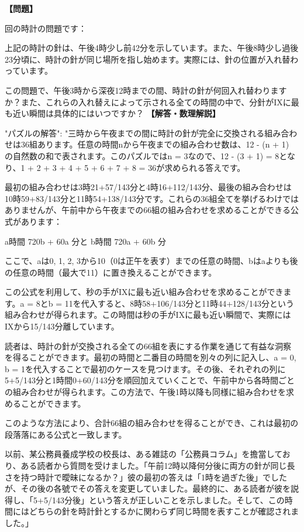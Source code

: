 \documentclass[10pt,a4paper,oneside,openany]{ltjsbook}
\begin{document}
\begin{tcolorbox}[colback=softblue,colframe=primaryblue,title=\textbf{第 61 問：CHANGING PLACES.},arc=2mm,boxrule=1pt,breakable]
\textbf{【問題】}\par\vspace{0.3em}
回の時計の問題です：

上記の時計の針は、午後4時少し前42分を示しています。また、午後8時少し過後23分頃に、時計の針が同じ場所を指し始めます。実際には、針の位置が入れ替わっています。

この問題で、午後3時から深夜12時までの間、時計の針が何回入れ替わりますか？また、これらの入れ替えによって示される全ての時間の中で、分針がIXに最も近い瞬間は具体的にはいつですか？
\tcblower
\textbf{【解答・数理解説】}\par\vspace{0.3em}
{
    "パズルの解答": "三時から午夜までの間に時計の針が完全に交換される組み合わせは36組あります。任意の時間nから午夜までの組み合わせ数は、12 - (n + 1) の自然数の和で表されます。このパズルではn = 3なので、12 - (3 + 1) = 8となり、1 + 2 + 3 + 4 + 5 + 6 + 7 + 8 = 36が求められる答えです。

最初の組み合わせは3時21+57/143分と4時16+112/143分、最後の組み合わせは10時59+83/143分と11時54+138/143分です。これらの36組全てを挙げるわけではありませんが、午前中から午夜までの66組の組み合わせを求めることができる公式があります：

a時間 720b + 60a 分と b時間 720a + 60b 分

ここで、aは0, 1, 2, 3から10（0は正午を表す）までの任意の時間、bはaよりも後の任意の時間（最大で11）に置き換えることができます。

この公式を利用して、秒の手がIXに最も近い組み合わせを求めることができます。a = 8とb = 11を代入すると、8時58+106/143分と11時44+128/143分という組み合わせが得られます。この時間は秒の手がIXに最も近い瞬間で、実際にはIXから15/143分離しています。

読者は、時計の針が交換される全ての66組を表にする作業を通じて有益な洞察を得ることができます。最初の時間と二番目の時間を別々の列に記入し、a = 0, b = 1を代入することで最初のケースを見つけます。その後、それぞれの列に5+5/143分と1時間0+60/143分を順回加えていくことで、午前中から各時間ごとの組み合わせが得られます。この方法で、午後1時以降も同様に組み合わせを求めることができます。

このような方法により、合計66組の組み合わせを得ることができ、これは最初の段落落にある公式と一致します。

以前、某公務員養成学校の校長は、ある雑誌の「公務員コラム」を擔當しており、ある読者から質問を受けました。「午前12時以降何分後に両方の針が同じ長さを持つ時計で曖昧になるか？」彼の最初の答えは「1時を過ぎた後」でしたが、その後の各號でその答えを変更していました。最終的に、ある読者が彼を説得し、「5+5/143分後」という答えが正しいことを示しました。そして、この時間にはどちらの針を時計針とするかに関わらず同じ時間を表すことが確認されました。」
}
\end{tcolorbox}
\end{document}
